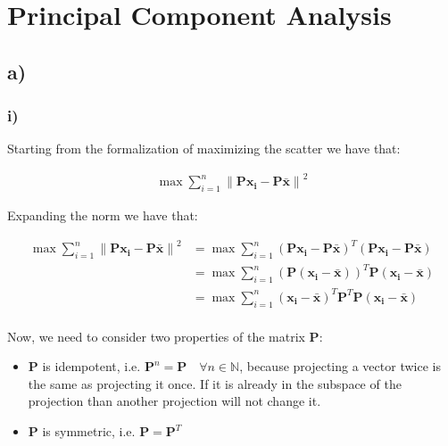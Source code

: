 \documentclass[12pt,a4paper,oneside]{paper}
\begin{document}
\pagestyle{plain}


\def\title {Homework Assignment 3}

 
\cleardoublepage
{}\selectfont
\setcounter{page}{0}
\tableofcontents
\newpage

\small

\section{Principal Component Analysis}

\subsection*{a)}

\subsubsection*{i)}

Starting from the formalization of maximizing the scatter we have that: 

\begin{align*}
        \max \sum_{i=1}^{n} \left\| \bm{P} \bm{x_i} - \bm{P} \bm{\bar{x}} \right\|^2
\end{align*}

Expanding the norm we have that:


\begin{align*}
    \max \sum_{i=1}^{n} \left\| \bm{P} \bm{x_i} - \bm{P} \bm{\bar{x}} \right\|^2 &= \max \sum_{i=1}^{n} \left( \bm{P} \bm{x_i} - \bm{P} \bm{\bar{x}} \right)^T \left( \bm{P} \bm{x_i} - \bm{P} \bm{\bar{x}} \right) \\
    &= \max \sum_{i=1}^{n} \left( \bm{P} \left( \bm{x_i} - \bm{\bar{x}} \right) \right)^T \bm{P} \left( \bm{x_i} - \bm{\bar{x}} \right) \\
    &= \max \sum_{i=1}^{n} \left( \bm{x_i} - \bm{\bar{x}} \right)^T \bm{P}^T \bm{P} \left( \bm{x_i} - \bm{\bar{x}} \right) \\
\end{align*}

Now, we need to consider two properties of the matrix $\bm{P}$:
\begin{itemize}
    \item $\bm{P}$ is idempotent, i.e. $\bm{P}^n = \bm{P} \quad \forall n \in \mathbb{N} $, because projecting a vector twice is the same as projecting it once. If it is already in the subspace of the projection than another projection will not change it.
    \item $\bm{P}$ is symmetric, i.e. $\bm{P} = \bm{P}^T$
\end{itemize}
\end{document}
